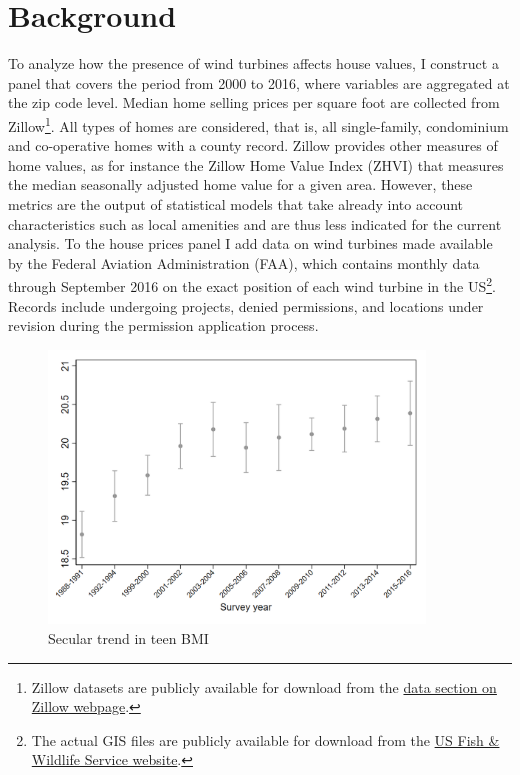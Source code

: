 \documentclass[twoside,12pt]{article}
\begin{document}
\section{Background}
To analyze how the presence of wind turbines affects house values, I construct a panel that covers the period from 2000 to 2016, where variables are aggregated at the zip code level. Median home selling prices per square foot are collected from Zillow\footnote{Zillow datasets are publicly available for download from the \href{http://www.zillow.com/research/data/}{data section on Zillow webpage}.}. All types of homes are considered, that is, all single-family, condominium and co-operative homes with a county record. Zillow provides other measures of home values, as for instance the Zillow Home Value Index (ZHVI) that measures the median seasonally adjusted home value for a given area. However, these metrics are the output of statistical models that take already into account characteristics such as local amenities and are thus less indicated for the current analysis. To the house prices panel I add data on wind turbines made available by the Federal Aviation Administration (FAA), which contains monthly data through September 2016 on the exact position of each wind turbine in the US\footnote{The actual GIS files are publicly available for download from the \href{https://www.fws.gov/southwest/es/Energy_Wind_FAA.html}{US Fish \& Wildlife Service website}.}. Records include undergoing projects, denied permissions, and locations under revision during the permission application process. 
\begin{figure}[htp]
  \centering
  \label{homestrend}\caption{Secular trend in teen BMI}
  \includegraphics[width=100mm]{Trends_in_obesity_nhanes/output/bmi_2to18_nhanes.png}
\end{figure}
\end{document}
